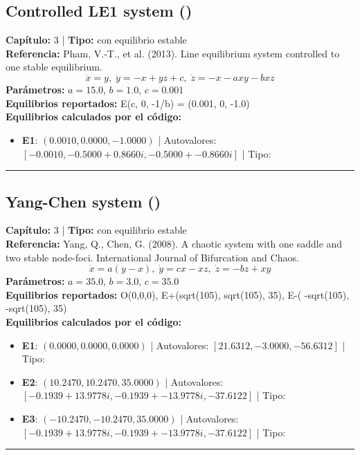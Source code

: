 \subsection*{Controlled LE1 system ()}
\textbf{Capítulo:} 3 | \textbf{Tipo:} con equilibrio estable\\
\textbf{Referencia:} Pham, V.-T., et al. (2013). Line equilibrium system controlled to one stable equilibrium.\\
\[\dot{x}=y, \; \dot{y}=-x+yz+c, \; \dot{z}=-x-axy-bxz\]
\textbf{Parámetros:} $a = 15.0$, $b = 1.0$, $c = 0.001$\\
\textbf{Equilibrios reportados:} E(c, 0, -1/b) = (0.001, 0, -1.0)\\
\textbf{Equilibrios calculados por el código:}
\begin{itemize}
  \item \textbf{E1}: $(0.0010, 0.0000, -1.0000)$ | Autovalores: $[-0.0010, -0.5000 + 0.8660i, -0.5000 + -0.8660i]$ | Tipo: 
\end{itemize}
\hrule

\subsection*{Yang-Chen system ()}
\textbf{Capítulo:} 3 | \textbf{Tipo:} con equilibrio estable\\
\textbf{Referencia:} Yang, Q., Chen, G. (2008). A chaotic system with one saddle and two stable node-foci. International Journal of Bifurcation and Chaos.\\
\[\dot{x}=a(y-x), \; \dot{y}=cx-xz, \; \dot{z}=-bz+xy\]
\textbf{Parámetros:} $a = 35.0$, $b = 3.0$, $c = 35.0$\\
\textbf{Equilibrios reportados:} O(0,0,0), E+(sqrt(105), sqrt(105), 35), E-( -sqrt(105), -sqrt(105), 35)\\
\textbf{Equilibrios calculados por el código:}
\begin{itemize}
  \item \textbf{E1}: $(0.0000, 0.0000, 0.0000)$ | Autovalores: $[21.6312, -3.0000, -56.6312]$ | Tipo: 
  \item \textbf{E2}: $(10.2470, 10.2470, 35.0000)$ | Autovalores: $[-0.1939 + 13.9778i, -0.1939 + -13.9778i, -37.6122]$ | Tipo: 
  \item \textbf{E3}: $(-10.2470, -10.2470, 35.0000)$ | Autovalores: $[-0.1939 + 13.9778i, -0.1939 + -13.9778i, -37.6122]$ | Tipo: 
\end{itemize}
\hrule

